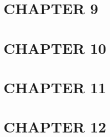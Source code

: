 \chapter{CHAPTER 9}


\chapter{CHAPTER 10}


\chapter{CHAPTER 11}


\chapter{CHAPTER 12}




\cite{cherokeeNationDownloads}
